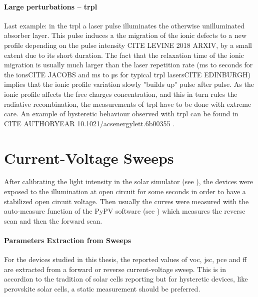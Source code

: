 		\paragraph{Large perturbations -- \gls{trpl}} Last example: in the \glsdesc{trpl} a laser pulse illuminates the otherwise unilluminated absorber layer. This pulse induces a the migration of the ionic defects to a new profile depending on the pulse intensity CITE LEVINE 2018 ARXIV, by a small extent due to its short duration. The fact that the relaxation time of the ionic migration is usually much larger than the laser repetition rate (\si{\ms} to seconds for the ionsCITE JACOBS and \si{\ms} to \si{\us} for typical \gls{trpl} lasersCITE EDINBURGH) implies that the ionic profile variation slowly "builds up" pulse after pulse. As the ionic profile affects the free charges concentration, and this in turn rules the radiative recombination, the measurements of \gls{trpl} have to be done with extreme care. An example of hysteretic behaviour observed with \gls{trpl} can be found in CITE AUTHORYEAR 10.1021/acsenergylett.6b00355 .


\section{Current-Voltage Sweeps}

	After calibrating the light intensity in the solar simulator (see ), the devices were exposed to the illumination at open circuit for some seconds in order to have a stabilized open circuit voltage. Then usually the curves were measured with the auto-measure function of the PyPV software (see ) which measures the reverse scan and then the forward scan.

	\paragraph{Parameters Extraction from Sweeps}
	For the devices studied in this thesis, the reported values of \gls{voc}, \gls{jsc}, \gls{pce} and \gls{ff} are extracted from a forward or reverse current-voltage sweep. This is in accordion to the tradition of solar cells reporting but for hysteretic devices, like perovskite solar cells, a static measurement should be preferred. %

